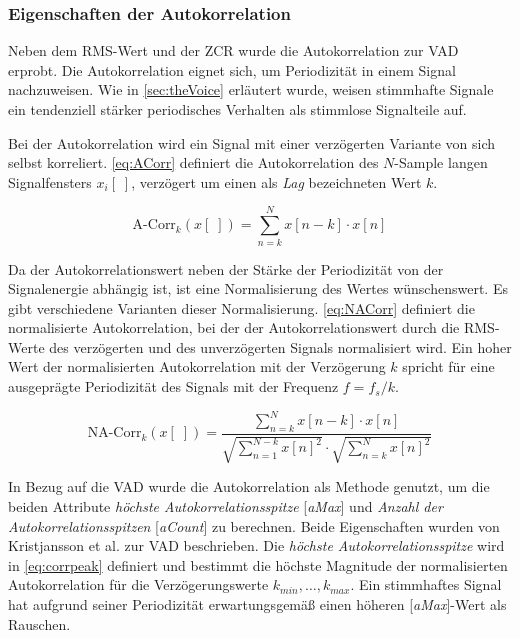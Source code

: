 \subsubsection{Eigenschaften der Autokorrelation}

Neben dem RMS-Wert und der ZCR wurde die Autokorrelation zur VAD erprobt. Die Autokorrelation eignet sich, um Periodizität in einem Signal nachzuweisen. Wie in \autoref{sec:theVoice} erläutert wurde, weisen stimmhafte Signale ein tendenziell stärker periodisches Verhalten als stimmlose Signalteile auf. 

Bei der Autokorrelation wird ein Signal mit einer verzögerten Variante von sich selbst korreliert. \autoref{eq:ACorr} definiert die Autokorrelation des $N$-Sample langen Signalfensters $x_i[\;]$, verzögert um einen als \emph{Lag} bezeichneten Wert $k$.\cite[S. 1]{vad_Lisboa}

\begin{equation}
\text{A-Corr}_k(x[\;]) = \sum_{n=k}^{N} x[n-k] \cdot x[n]
\label{eq:ACorr}
\end{equation}

Da der Autokorrelationswert neben der Stärke der Periodizität von der Signalenergie abhängig ist, ist eine Normalisierung des Wertes wünschenswert. Es gibt verschiedene Varianten dieser Normalisierung. \autoref{eq:NACorr} definiert die \glqq normalisierte Autokorrelation\grqq{}, bei der der Autokorrelationswert durch die RMS-Werte des verzögerten und des unverzögerten Signals normalisiert wird. Ein hoher Wert der normalisierten Autokorrelation mit der Verzögerung $k$ spricht für eine ausgeprägte Periodizität des Signals mit der Frequenz $f =  f_s / k $.\cite[S. 1 - 2]{vad_Lisboa}

\begin{equation}
\text{NA-Corr}_k(x[\;]) = \frac{\sum_{n=k}^{N} x[n-k] \cdot x[n]}{ \sqrt{\sum_{n=1}^{N-k}  x[n]^2}  \cdot  \sqrt{\sum_{n=k}^{N}  x[n]^2} }
\label{eq:NACorr}
\end{equation}



In Bezug auf die VAD wurde die Autokorrelation als Methode genutzt, um die beiden Attribute \emph{höchste Autokorrelationsspitze} [\emph{aMax}] und \emph{Anzahl der Autokorrelationsspitzen} [\emph{aCount}] zu berechnen. Beide Eigenschaften wurden von Kristjansson et al. \cite[S. 1 - 2]{vad_Lisboa} zur VAD beschrieben. Die \emph{höchste Autokorrelationsspitze} wird in \autoref{eq:corrpeak} definiert und bestimmt die höchste Magnitude der normalisierten Autokorrelation für die Verzögerungswerte $k_{min} , \ldots , k_{max}$. Ein stimmhaftes Signal hat aufgrund seiner Periodizität erwartungsgemäß einen höheren [\emph{aMax}]-Wert als Rauschen.

